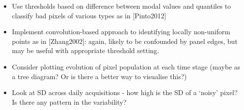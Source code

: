 \documentclass[10pt,fleqn]{article}
\begin{document}
\begin{itemize}

\item
Use thresholds based on difference between modal values and quantiles to classify bad pixels of various types as in [Pinto2012]

\item
Implement convolution-based approach to identifying locally non-uniform points as in [Zhang2002]: again, likely to be confounded by panel edges, but may be useful with appropriate threshold setting.

\item
Consider plotting evolution of pixel population at each time stage (maybe as a tree diagram? Or is there a better way to visualise this?)

\item
Look at SD across daily acquisitions - how high is the SD of a `noisy' pixel? Is there any pattern in the variability? 



\end{itemize}

\end{document}
